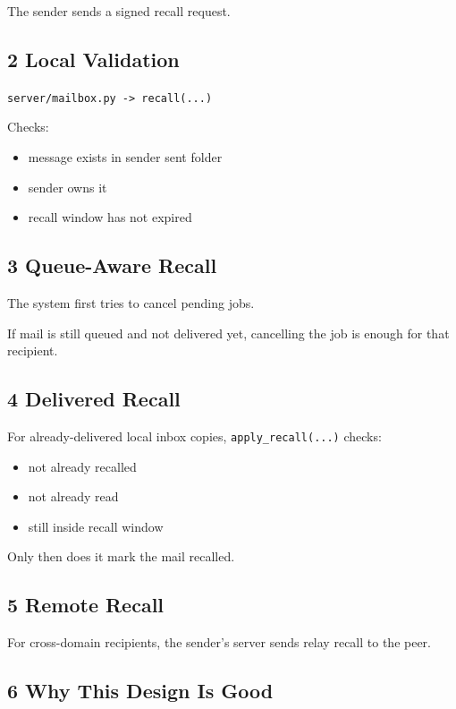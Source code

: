 \documentclass[11pt,a4paper]{article}
\begin{document}
The sender sends a signed recall request.

\subsection{2 Local Validation}

\nolinkurl{server/mailbox.py -> recall(...)}

Checks:

\begin{itemize}
\item message exists in sender sent folder
\item sender owns it
\item recall window has not expired
\end{itemize}

\subsection{3 Queue-Aware Recall}

The system first tries to cancel pending jobs.

If mail is still queued and not delivered yet, cancelling the job is enough for that recipient.

\subsection{4 Delivered Recall}

For already-delivered local inbox copies, \nolinkurl{apply_recall(...)} checks:

\begin{itemize}
\item not already recalled
\item not already read
\item still inside recall window
\end{itemize}

Only then does it mark the mail recalled.

\subsection{5 Remote Recall}

For cross-domain recipients, the sender's server sends relay recall to the peer.

\subsection{6 Why This Design Is Good}
\end{document}
